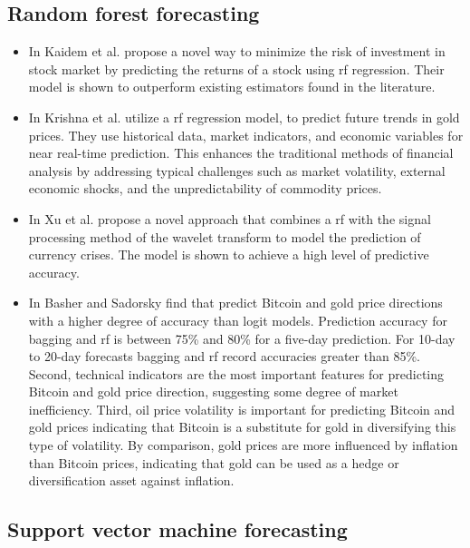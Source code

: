 \subsection{Random forest forecasting}\label{Random Forest forecasting}

\begin{itemize}
    \item In \cite{prediction} Kaidem et al. propose a novel way to minimize the risk of investment in stock market by predicting the returns of a stock using \gls{rf} regression. Their model is shown to outperform existing estimators found in the literature.
    \item In \cite{gold} Krishna et al. utilize a \gls{rf} regression model, to predict future trends in gold prices. They use historical data, market indicators, and economic variables for near real-time prediction. This enhances the traditional methods of financial analysis by addressing typical challenges such as market volatility, external economic shocks, and the unpredictability of commodity prices.
    \item In \cite{wavelet} Xu et al. propose a novel approach that combines a \gls{rf} with the signal processing method of the wavelet transform to model the prediction of currency crises. The model is shown to achieve a high level of predictive accuracy.
    \item In \cite{bitcoin} Basher and Sadorsky find that  predict Bitcoin and gold price directions with a higher degree of accuracy than logit models. Prediction accuracy for bagging and \gls{rf} is between 75\% and 80\% for a five-day prediction. For 10-day to 20-day forecasts bagging and \gls{rf} record accuracies greater than 85\%. Second, technical indicators are the most important features for predicting Bitcoin and gold price direction, suggesting some degree of market inefficiency. Third, oil price volatility is important for predicting Bitcoin and gold prices indicating that Bitcoin is a substitute for gold in diversifying this type of volatility. By comparison, gold prices are more influenced by inflation than Bitcoin prices, indicating that gold can be used as a hedge or diversification asset against inflation.
\end{itemize}

\subsection{Support vector machine forecasting}\label{Support vector machine forecasting}

